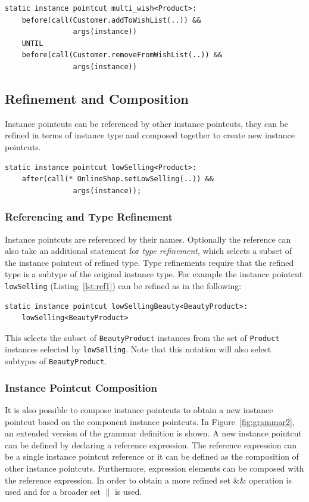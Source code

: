 \documentclass{acm_proc_article-sp}
\begin{document}
\begin{lstlisting}[float=h!, caption={An instance pointcut utilizing multiset property}, label={lst:wishlisted}]
static instance pointcut multi_wish<Product>: 
	before(call(Customer.addToWishList(..)) && 
				args(instance))
	UNTIL 
	before(call(Customer.removeFromWishList(..)) && 
				args(instance))
\end{lstlisting}


\subsection{Refinement and Composition}

Instance pointcuts can be referenced by other instance pointcuts, they can be refined in terms of instance type and composed together to create new instance pointcuts. 

\begin{lstlisting}[float=h!, caption={An instance pointcut selecting low-selling products}, label={lst:ref1}]
static instance pointcut lowSelling<Product>: 
	after(call(* OnlineShop.setLowSelling(..)) && 
				args(instance));
\end{lstlisting}

\subsubsection{Referencing and Type Refinement}
Instance pointcuts are referenced by their names. Optionally the reference can also take an additional statement for \emph{type refinement}, which selects a subset of the instance pointcut of refined type. Type refinements require that the refined type is a subtype of the original instance type. For example the instance pointcut \lstinline{lowSelling} (Listing~\ref{lst:ref1}) can be refined as in the following:
\begin{lstlisting}[float=h!]
static instance pointcut lowSellingBeauty<BeautyProduct>: 
	lowSelling<BeautyProduct>
\end{lstlisting}

This selects the subset of \lstinline{BeautyProduct} instances from the set of \lstinline{Product} instances selected by \lstinline{lowSelling}. 
Note that this notation will also select subtypes of \lstinline{BeautyProduct}. 

\subsubsection{Instance Pointcut Composition}
It is also possible to compose instance pointcuts to obtain a new instance pointcut based on the component instance pointcuts. In Figure~\ref{fig:grammar2}, an extended version of the grammar definition is shown. A new instance pointcut can be defined by declaring a reference expression. The reference expression can be a single instance pointcut reference or it can be defined as the composition of other instance pointcuts.  Furthermore, expression elements can be composed with the reference expression. In order to obtain a more refined set \&\& operation is used and for a broader set $\|$ is used. 
\end{document}
